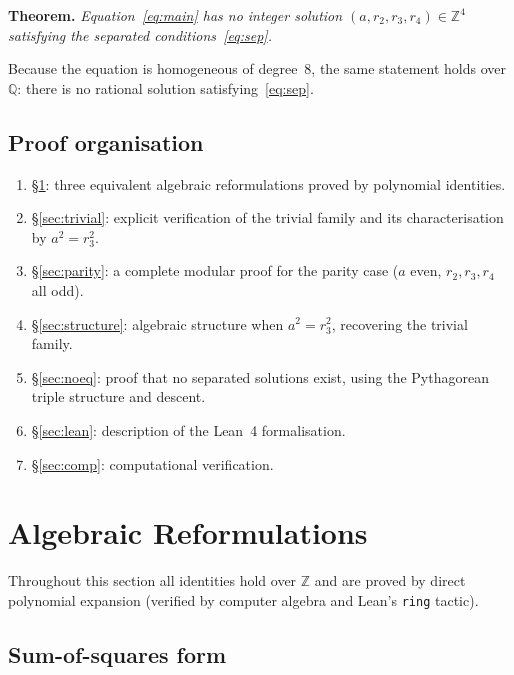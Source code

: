 \documentclass[12pt, a4paper]{article}
\theoremstyle{definition}
\newcommand{\Z}{\mathbb{Z}}
\newcommand{\Q}{\mathbb{Q}}
\begin{document}
\begin{tcolorbox}[highlight, title={Main Theorem}]
  \textbf{Theorem.}\;
  \emph{Equation~\eqref{eq:main} has no integer solution
  $(a, r_2, r_3, r_4) \in \Z^4$ satisfying the separated
  conditions~\eqref{eq:sep}.}
\end{tcolorbox}

\noindent
Because the equation is homogeneous of degree~8, the same statement holds over
$\Q$: there is no rational solution satisfying~\eqref{eq:sep}.

\subsection*{Proof organisation}

\begin{enumerate}[leftmargin=1.5em]
  \item \S\ref{sec:algebra}: three equivalent algebraic reformulations proved
    by polynomial identities.
  \item \S\ref{sec:trivial}: explicit verification of the trivial family and
    its characterisation by $a^2=r_3^2$.
  \item \S\ref{sec:parity}: a complete modular proof for the parity case
    ($a$ even, $r_2,r_3,r_4$ all odd).
  \item \S\ref{sec:structure}: algebraic structure when $a^2=r_3^2$, recovering
    the trivial family.
  \item \S\ref{sec:noeq}: proof that no separated solutions exist, using the
    Pythagorean triple structure and descent.
  \item \S\ref{sec:lean}: description of the Lean~4 formalisation.
  \item \S\ref{sec:comp}: computational verification.
\end{enumerate}

\section{Algebraic Reformulations}\label{sec:algebra}

Throughout this section all identities hold over $\Z$ and are proved by direct
polynomial expansion (verified by computer algebra and Lean's \texttt{ring}
tactic).

\subsection{Sum-of-squares form}
\end{document}
